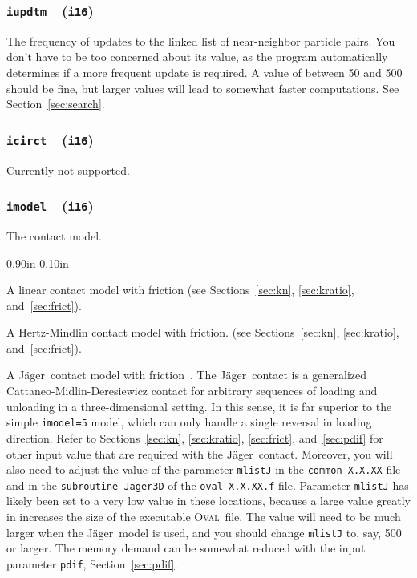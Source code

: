 \documentclass[letterpaper,11pt]{article}
\newcommand{\Oval}{\textsc{Oval}}
\newcommand{\Var}[2]{\texttt{#1}\ \  (\texttt{#2})}
\newlength{\Labelwidth}
\newcommand{\Entrylabel}[1]{\makebox[\Labelwidth][r]{\texttt{#1}}}
\newenvironment{Options}
{\begin{list}{}{%
\renewcommand{\makelabel}{\Entrylabel}%
\setlength{\leftmargin} {0.90in}%
\setlength{\rightmargin}{0.00in}%
\setlength{\labelsep}   {0.10in}%
\setlength{\labelwidth} {\Labelwidth}%
}}
{\end{list}}
\begin{document}
\subsubsection[\texttt{iupdtm}]{\Var{iupdtm}{i16}}\label{sec:iupdtm}
The frequency of updates to the linked list of near-neighbor particle pairs.
You don't have to be too concerned about its value, as the
program automatically determines if a more frequent update is required.
A value of between 50 and 500 should be fine, but larger values will
lead to somewhat faster computations.  See Section~\ref{sec:search}.
%
\subsubsection[\texttt{icirct}]{\Var{icirct}{i16}}
Currently not supported.
%
\subsubsection[\texttt{imodel}]{\Var{imodel}{i16}}\label{sec:imodel}
The contact model.
\begin{Options}
\item[imodel=0]
A linear contact model with friction 
(see Sections~\ref{sec:kn}, \ref{sec:kratio}, and~\ref{sec:frict}).
\item[imodel=5]
A Hertz-Mindlin contact model with friction.
(see Sections~\ref{sec:kn}, \ref{sec:kratio}, and~\ref{sec:frict}).
\item[imodel=6]
A J\"{a}ger\ contact model with 
friction~\cite{Jager:2005a,Kuhn:review}.
The J\"{a}ger\ contact is a generalized Cattaneo-Midlin-Deresiewicz contact
for arbitrary sequences of loading and unloading in a three-dimensional
setting.  In this sense, it is far superior to the
simple \texttt{imodel=5} model, which can only handle a single
reversal in loading direction.
Refer to Sections~\ref{sec:kn}, \ref{sec:kratio}, \ref{sec:frict},
and~\ref{sec:pdif}
for other input value that are required with the J\"{a}ger\ contact.
Moreover, you will also need to adjust the 
value of the parameter \texttt{mlistJ} in the
\texttt{common-X.X.XX} file and in the \texttt{subroutine Jager3D}
of the \texttt{oval-X.X.XX.f} file.
Parameter \texttt{mlistJ} has likely been set to a very low value in these
locations, because a large value greatly in increases the
size of the executable \Oval\ file. 
The value will need to be much larger when the J\"{a}ger\ model
is used, and you should change  \texttt{mlistJ} to, say, 500 or larger.
The memory demand can be somewhat reduced with the input parameter
\texttt{pdif}, Section~\ref{sec:pdif}.
\end{Options}
%
\end{document}
